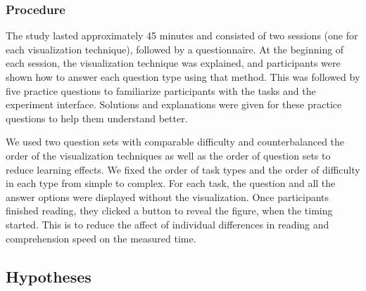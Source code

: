 \subsubsection{Procedure} The study lasted approximately 45 minutes and consisted of two sessions (one for each visualization technique), followed by a questionnaire. At the beginning of each session, the visualization technique was explained, and participants were shown how to answer each question type using that method. This was followed by five practice questions to familiarize participants with the tasks and the experiment interface. Solutions and explanations were given for these practice questions to help them understand better.

We used two question sets with comparable difficulty and counterbalanced the order of the visualization techniques as well as the order of question sets to reduce learning effects. We fixed the order of task types and the order of difficulty in each type from simple to complex. For each task, the question and all the answer options were displayed without the visualization. Once participants finished reading, they clicked a button to reveal the figure, when the timing started. This is to reduce the affect of individual differences in reading and comprehension speed on the measured time. 

\subsection{Hypotheses}

